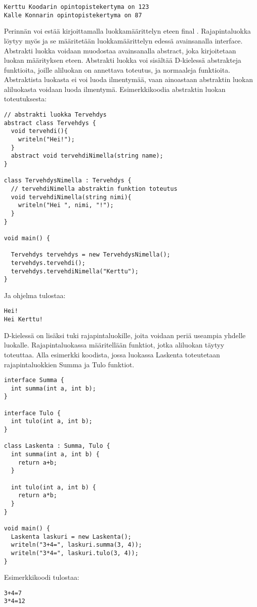 \documentclass[11pt,oneside,a4paper]{article}
\begin{document}
\begin{verbatim}
Kerttu Koodarin opintopistekertyma on 123
Kalle Konnarin opintopistekertyma on 87
\end{verbatim}
Perinnän voi estää kirjoittamalla luokkamäärittelyn eteen final \cite{DLA13}. Rajapintaluokka löytyy myös ja se määritetään luokkamäärittelyn edessä avainsanalla interface. 
Abstrakti luokka voidaan muodostaa avainsanalla abstract, joka kirjoitetaan luokan määrityksen eteen. Abstrakti luokka voi sisältää D-kielessä abstrakteja funktioita, joille aliluokan on annettava toteutus, ja normaaleja funktioita. Abstraktista luokasta ei voi luoda ilmentymää, vaan ainoastaan abstraktin luokan aliluokasta voidaan luoda ilmentymä. Esimerkkikoodia abstraktin luokan toteutuksesta:
\begin{verbatim}
// abstrakti luokka Tervehdys
abstract class Tervehdys { 
  void tervehdi(){ 
    writeln("Hei!"); 
  } 
  abstract void tervehdiNimella(string name); 
} 

class TervehdysNimella : Tervehdys { 
  // tervehdiNimella abstraktin funktion toteutus
  void tervehdiNimella(string nimi){ 
    writeln("Hei ", nimi, "!"); 
  } 
} 

void main() {

  Tervehdys tervehdys = new TervehdysNimella(); 
  tervehdys.tervehdi(); 
  tervehdys.tervehdiNimella("Kerttu"); 
}
\end{verbatim}
Ja ohjelma tulostaa:
\begin{verbatim}
Hei!
Hei Kerttu!
\end{verbatim}

D-kielessä on lisäksi tuki rajapintaluokille, joita voidaan periä useampia yhdelle luokalle. Rajapintaluokassa määritellään funktiot, jotka aliluokan täytyy toteuttaa. Alla esimerkki koodista, jossa luokassa Laskenta toteutetaan rajapintaluokkien Summa ja Tulo funktiot.

\begin{verbatim}
interface Summa { 
  int summa(int a, int b); 
} 

interface Tulo {
  int tulo(int a, int b);
}

class Laskenta : Summa, Tulo { 
  int summa(int a, int b) { 
    return a+b;
  } 

  int tulo(int a, int b) {
    return a*b;
  }
} 

void main() {
  Laskenta laskuri = new Laskenta();
  writeln("3+4=", laskuri.summa(3, 4));
  writeln("3*4=", laskuri.tulo(3, 4));
}
\end{verbatim}
Esimerkkikoodi tulostaa:
\begin{verbatim}
3+4=7
3*4=12
\end{verbatim}
\end{document}
